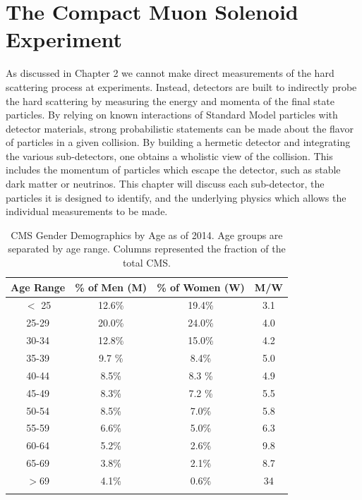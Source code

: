 \chapter{The Compact Muon Solenoid Experiment \label{ch:cms}} 
As discussed in Chapter 2  we cannot make direct measurements of the hard scattering process at
experiments. Instead, detectors are built to indirectly probe the hard scattering by measuring the energy and
momenta of the final state particles.
 By relying on known interactions of Standard Model particles with detector materials, strong probabilistic statements can be made about
the flavor of particles in a given collision. 
By building a hermetic detector and integrating the various sub-detectors, one 
obtains a wholistic view of the collision. This includes the momentum of particles
which escape the detector, such as stable dark matter or neutrinos. 
This chapter will discuss each sub-detector, the particles it is designed to identify, and the 
underlying physics which allows the individual measurements to be made.
\begin{center}
\begin{table}[]
\begin{center}
\caption{CMS Gender Demographics by Age as of 2014. Age groups are separated by age range. Columns represented the fraction of the total CMS. }
\begin{tabular}{cccc}
\textbf{Age Range} & \textbf{\% of Men (M)} & \textbf{\% of Women (W)} & \textbf{M/W}\\
\hline
$<$ 25 & 12.6\% & 19.4\% & 3.1  \\
25-29 & 20.0\% & 24.0\% & 4.0  \\
30-34 & 12.8\% & 15.0\% & 4.2  \\
35-39 & 9.7 \% & 8.4\%  & 5.0  \\
40-44 & 8.5\%  & 8.3 \% & 4.9  \\
45-49 & 8.3\%  & 7.2 \% & 5.5  \\
50-54 & 8.5\%  & 7.0\%  & 5.8  \\
55-59 & 6.6\%  & 5.0\%  & 6.3  \\
60-64 & 5.2\%  & 2.6\%  & 9.8  \\ 
65-69 & 3.8\%  & 2.1\%  & 8.7  \\
$>$69  & 4.1\%  & 0.6\%  & 34 \\ 
\label{tab:gender}
\end{tabular}
\end{center}
\end{table}
\end{center}
